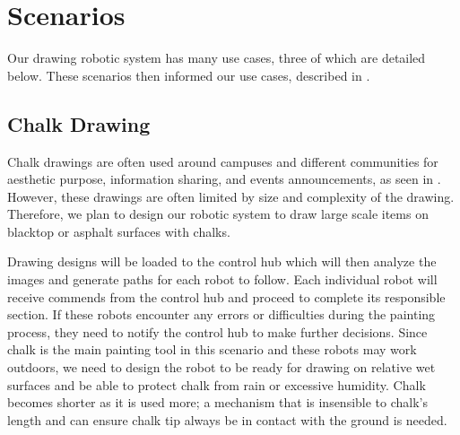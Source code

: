 
\section{Scenarios}
\label{sec:scenarios}
Our drawing robotic system has many use cases, three of which are detailed below. These scenarios then informed our use cases, described in . 


\subsection{Chalk Drawing}
Chalk drawings are often used around campuses and different communities for aesthetic purpose, information sharing, and events announcements, as seen in . However, these drawings are often limited by size and complexity of the drawing. Therefore, we plan to design our robotic system to draw large scale items on blacktop or asphalt surfaces with chalks.

Drawing designs will be loaded to the control hub which will then analyze the images and generate paths for each robot to follow. Each individual robot will receive commends from the control hub and proceed to complete its responsible section. If these robots encounter any errors or difficulties during the painting process, they need to notify the control hub to make further decisions. Since chalk is the main painting tool in this scenario and these robots may work outdoors, we need to design the robot to be ready for drawing on relative wet surfaces and be able to protect chalk from rain or excessive humidity. Chalk becomes shorter as it is used more; a mechanism that is insensible to chalk's length and can ensure chalk tip always be in contact with the ground is needed. 

